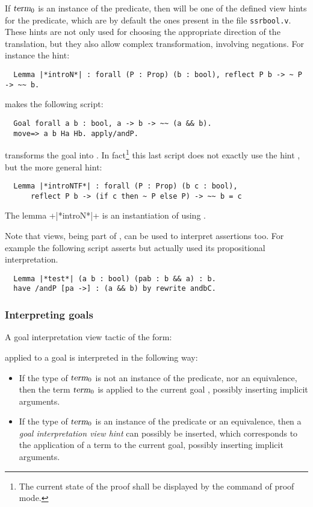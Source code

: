 If $\ssrN[0]{term}$ is an instance of the  predicate, then 
will be one of the defined view hints  for the 
predicate,  which are by
default the ones present in the file {\tt ssrbool.v}.
These hints are not only used for choosing the appropriate direction of
the translation, but they also allow complex transformation, involving
negations.
 For instance the hint:
\begin{lstlisting}
  Lemma |*introN*| : forall (P : Prop) (b : bool), reflect P b -> ~ P -> ~~ b.
\end{lstlisting}
makes the following script:
\begin{lstlisting}
  Goal forall a b : bool, a -> b -> ~~ (a && b).
  move=> a b Ha Hb. apply/andP.
\end{lstlisting}
transforms the goal into .
In fact\footnote{The current state of the proof shall be displayed by
  the  command of \Coq{} proof mode.}
this last script does not exactly use the hint , but the
more general hint:
\begin{lstlisting}
  Lemma |*introNTF*| : forall (P : Prop) (b c : bool),
      reflect P b -> (if c then ~ P else P) -> ~~ b = c
\end{lstlisting}
The lemma \ssrL+|*introN*|+ is an instantiation of  using
 .

Note that views, being part of , can be used to interpret
assertions too. For example the following script asserts 
but actually used its propositional interpretation.
\begin{lstlisting}
  Lemma |*test*| (a b : bool) (pab : b && a) : b.
  have /andP [pa ->] : (a && b) by rewrite andbC.
\end{lstlisting}

\subsubsection*{Interpreting goals}

A goal interpretation view tactic of the form:

\begin{center}
         
\end{center}
applied to a goal  is interpreted in the following way:
\begin{itemize}
\item If the type of $\ssrN[0]{term}$ is not an instance of the
   predicate, nor an equivalence,
  then the term $\ssrN[0]{term}$ is applied to the current goal ,
  possibly inserting implicit arguments.
\item If the type of $\ssrN[0]{term}$ is an instance of the 
  predicate or an equivalence, then
a \emph{goal interpretation view hint} can possibly be inserted, which
corresponds to the application of a term
 to the current
goal, possibly inserting implicit arguments.
\end{itemize}

